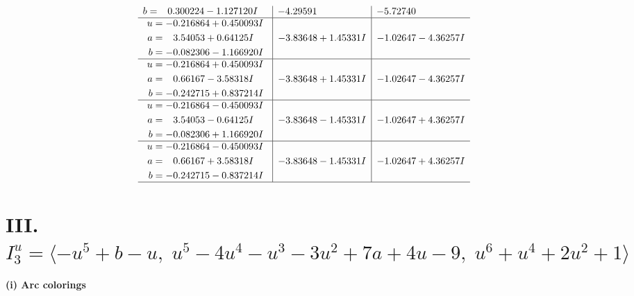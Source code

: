 \documentclass[1p]{elsarticle_modified}
\theoremstyle{definition}
\begin{document}
$$\begin{array}{c|c|c}
\begin{aligned}
b &= \phantom{-}0.300224 - 1.127120 I\end{aligned}
 & -4.29591\phantom{ +0.000000I} & -5.72740\phantom{ +0.000000I} \\ \hline\begin{aligned}
u &= -0.216864 + 0.450093 I \\
a &= \phantom{-}3.54053 + 0.64125 I \\
b &= -0.082306 - 1.166920 I\end{aligned}
 & -3.83648 + 1.45331 I & -1.02647 - 4.36257 I \\ \hline\begin{aligned}
u &= -0.216864 + 0.450093 I \\
a &= \phantom{-}0.66167 - 3.58318 I \\
b &= -0.242715 + 0.837214 I\end{aligned}
 & -3.83648 + 1.45331 I & -1.02647 - 4.36257 I \\ \hline\begin{aligned}
u &= -0.216864 - 0.450093 I \\
a &= \phantom{-}3.54053 - 0.64125 I \\
b &= -0.082306 + 1.166920 I\end{aligned}
 & -3.83648 - 1.45331 I & -1.02647 + 4.36257 I \\ \hline\begin{aligned}
u &= -0.216864 - 0.450093 I \\
a &= \phantom{-}0.66167 + 3.58318 I \\
b &= -0.242715 - 0.837214 I\end{aligned}
 & -3.83648 - 1.45331 I & -1.02647 + 4.36257 I\\
 \hline 
 \end{array}$$\newpage\newpage\renewcommand{\arraystretch}{1}
\centering \section*{III. $I^u_{3}= \langle - u^5+b- u,\;u^5-4 u^4- u^3-3 u^2+7 a+4 u-9,\;u^6+u^4+2 u^2+1 \rangle$}
\flushleft \textbf{(i) Arc colorings}\\
\end{document}

